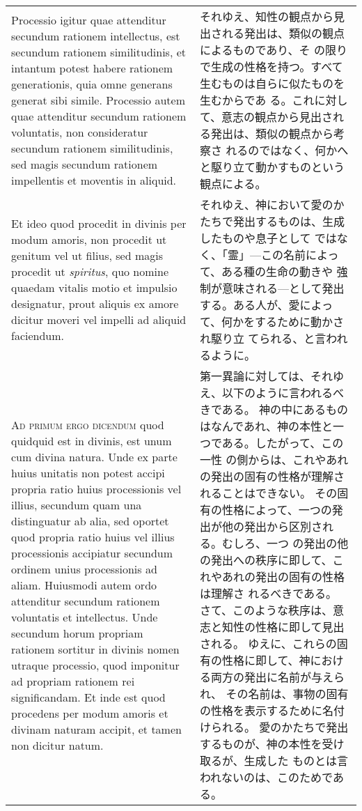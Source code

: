 \documentclass[10pt]{jsarticle} %
\begin{document}
\begin{longtable}{p{21em}p{21em}}
\\

Processio igitur quae attenditur secundum rationem
 intellectus, est secundum rationem similitudinis, et intantum potest
 habere rationem generationis, quia omne generans generat sibi
 simile. Processio autem quae attenditur secundum rationem voluntatis,
 non consideratur secundum rationem similitudinis, sed magis secundum
 rationem impellentis et moventis in aliquid. 



&

それゆえ、知性の観点から見出される発出は、類似の観点によるものであり、そ
 の限りで生成の性格を持つ。すべて生むものは自らに似たものを生むからであ
 る。これに対して、意志の観点から見出される発出は、類似の観点から考察さ
 れるのではなく、何かへと駆り立て動かすものという観点による。


\\


Et ideo quod procedit in
 divinis per modum amoris, non procedit ut genitum vel ut filius, sed
 magis procedit ut {\itshape spiritus}, quo nomine quaedam vitalis motio et
 impulsio designatur, prout aliquis ex amore dicitur moveri vel impelli
 ad aliquid faciendum.



&

それゆえ、神において愛のかたちで発出するものは、生成したものや息子として
 ではなく、「霊」---この名前によって、ある種の生命の動きや
 強制が意味される---として発出する。ある人が、愛によって、何かをするために動かされ駆り立
 てられる、と言われるように。

\\



{\scshape Ad primum ergo dicendum} quod quidquid est in divinis, est
 unum cum divina natura. Unde ex parte huius unitatis non potest accipi
 propria ratio huius processionis vel illius, secundum quam una
 distinguatur ab alia, sed oportet quod propria ratio huius vel illius
 processionis accipiatur secundum ordinem unius processionis ad
 aliam. Huiusmodi autem ordo attenditur secundum rationem voluntatis et
 intellectus. Unde secundum horum propriam rationem sortitur in divinis
 nomen utraque processio, quod imponitur ad propriam rationem rei
 significandam. Et inde est quod procedens per modum amoris et divinam
 naturam accipit, et tamen non dicitur natum.



&

第一異論に対しては、それゆえ、以下のように言われるべきである。
神の中にあるものはなんであれ、神の本性と一つである。したがって、この一性
 の側からは、これやあれの発出の固有の性格が理解されることはできない。
その固有の性格によって、一つの発出が他の発出から区別される。むしろ、一つ
 の発出の他の発出への秩序に即して、これやあれの発出の固有の性格は理解さ
 れるべきである。
さて、このような秩序は、意志と知性の性格に即して見出される。
ゆえに、これらの固有の性格に即して、神における両方の発出に名前が与えられ、
 その名前は、事物の固有の性格を表示するために名付けられる。
愛のかたちで発出するものが、神の本性を受け取るが、生成した
 ものとは言われないのは、このためである。


\end{longtable}
\end{document}
